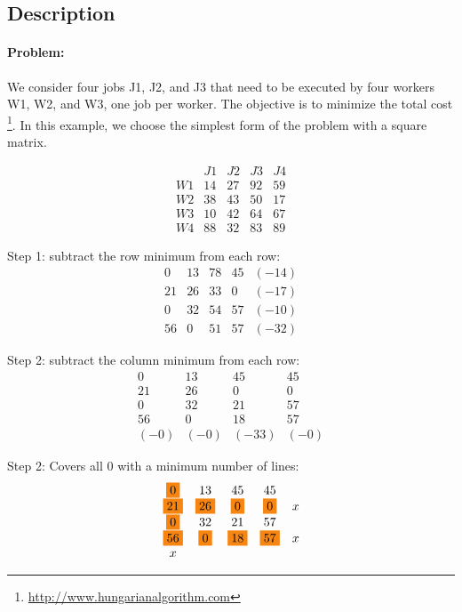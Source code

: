 \begin{appendices}
        \section{Description}
        \paragraph{Problem:} We consider four jobs J1, J2, and J3 that need to be executed by four workers W1, W2, and W3, one job per worker. The objective is to minimize the total cost \footnote{\url{http://www.hungarianalgorithm.com}}. In this example, we choose the simplest form of the problem with a square matrix.

        $$\begin{matrix}
        & J1 & J2 & J3 & J4 \\
        W1 & 14 & 27 & 92 & 59 \\
        W2 & 38 & 43 & 50 & 17 \\
        W3 & 10 & 42 & 64 & 67 \\
        W4 & 88 & 32 & 83 & 89
        \end{matrix}$$

        Step 1: subtract the row minimum from each row:
        $$\begin{matrix}
        0 & 13 & 78 & 45 & (-14) \\
        21 & 26 & 33 & 0 & (-17) \\
        0 & 32 & 54 & 57 & (-10) \\
        56 & 0 & 51 & 57 & (-32)
        \end{matrix}$$

        Step 2: subtract the column minimum from each row:
        $$\begin{matrix}
        0 & 13 & 45 & 45  \\
        21 & 26 & 0 & 0   \\
        0 & 32 & 21 & 57   \\
        56 & 0 & 18 & 57   \\
        (-0) & (-0) & (-33)  & (-0)
        \end{matrix}$$

        Step 2: Covers all 0 with a minimum number of lines:
        $$\begin{matrix}
        \colorbox{BurntOrange}0 & 13 & 45 & 45 &  \\
        \colorbox{BurntOrange}{21} & \colorbox{BurntOrange}{26} & \colorbox{BurntOrange}0 & \colorbox{BurntOrange}0 & x  \\
        \colorbox{BurntOrange}0 & 32 & 21 & 57 &  \\
        \colorbox{BurntOrange}{56} & \colorbox{BurntOrange}0 & \colorbox{BurntOrange}{18} & \colorbox{BurntOrange}{57} & x  \\
        x &  &  &  &
        \end{matrix}$$


\end{appendices}

